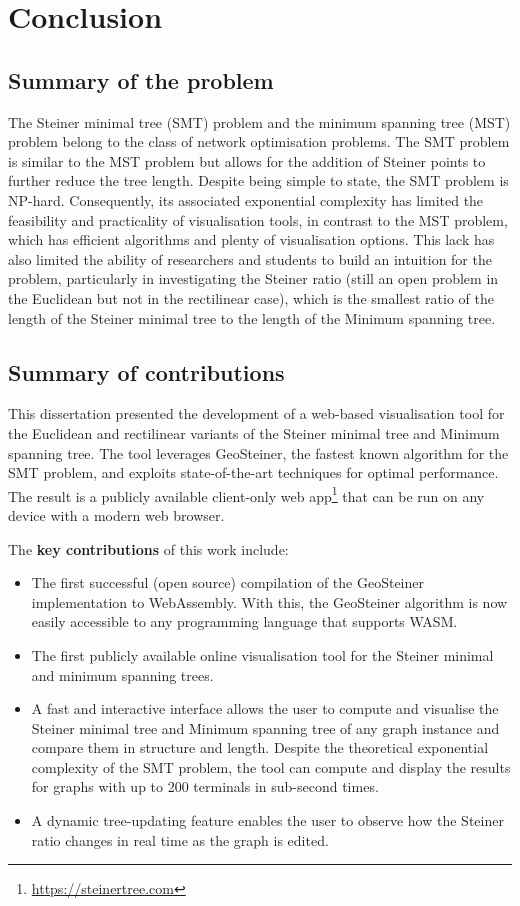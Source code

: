 \documentclass{l4proj}
\begin{document}
\chapter{Conclusion}
\label{sec:conclusion}
\section{Summary of the problem}
The Steiner minimal tree (SMT) problem and the minimum spanning tree (MST) problem belong to the class of network optimisation problems. The SMT problem is similar to the MST problem but allows for the addition of Steiner points to further reduce the tree length.
Despite being simple to state, the SMT problem is NP-hard. Consequently, its associated exponential complexity has limited the feasibility and practicality of visualisation tools, in contrast to the MST problem, which has efficient algorithms and plenty of visualisation options. This lack has also limited the ability of researchers and students to build an intuition for the problem, particularly in investigating the Steiner ratio (still an open problem in the Euclidean but not in the rectilinear case), which is the smallest ratio of the length of the Steiner minimal tree to the length of the Minimum spanning tree.

\section{Summary of contributions}
This dissertation presented the development of a web-based visualisation tool for the Euclidean and rectilinear variants of the Steiner minimal tree and Minimum spanning tree. The tool leverages GeoSteiner, the fastest known algorithm for the SMT problem, and exploits state-of-the-art techniques for optimal performance.
The result is a publicly available client-only web app\footnote{\url{https://steinertree.com}} that can be run on any device with a modern web browser.

The \textbf{key contributions} of this work include:
\begin{itemize}
    \item The first successful (open source) compilation of the GeoSteiner implementation to WebAssembly. With this, the GeoSteiner algorithm is now easily accessible to any programming language that supports WASM.
    \item The first publicly available online visualisation tool for the Steiner minimal and minimum spanning trees.
    \item A fast and interactive interface allows the user to compute and visualise the Steiner minimal tree and Minimum spanning tree of any graph instance and compare them in structure and length. Despite the theoretical exponential complexity of the SMT problem, the tool can compute and display the results for graphs with up to 200 terminals in sub-second times.
    \item A dynamic tree-updating feature enables the user to observe how the Steiner ratio changes in real time as the graph is edited.
\end{itemize}
\end{document}
